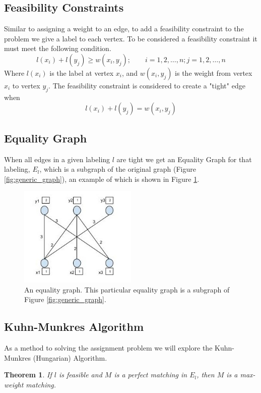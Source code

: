 \documentclass[twoside]{article}
\newcounter{lecnum}
\newtheorem{theorem}{Theorem}[lecnum]
\begin{document}
\subsection{Feasibility Constraints}
Similar to assigning a weight to an edge, to add a feasibility constraint to the problem we give a label to each vertex. To be considered a feasibility constraint it must meet the following condition.
\begin{equation} \label{eq1}
 l(x_{i}) + l(y_{j}) \geq w(x_{i},y_{j}); \qquad i=1,2,\ldots,n; j=1,2,\ldots,n
\end{equation}
Where $l(x_{i})$ is the label at vertex $x_{i}$, and $w(x_{i},y_{j})$ is the weight from vertex $x_{i}$ to vertex $y_{j}$. The feasibility constraint is considered to create a "tight" edge when 
\begin{equation} \label{eq2}
l(x_{i}) + l(y_{j}) = w(x_{i},y_{j})
\end{equation}

\subsection{Equality Graph}

When all edges in a given labeling $l$ are tight we get an Equality Graph for that labeling, $E_{l}$, which is a subgraph of the original graph (Figure \ref{fig:generic_graph}), an example of which is shown in Figure \ref{fig:equality_graph}.

\begin{figure}[h]
\begin{framed}
\centering
\includegraphics[width=0.5\textwidth]{figure2.jpg}
\end{framed}
\caption{\label{fig:equality_graph}An equality graph. This particular equality graph is a subgraph of Figure \ref{fig:generic_graph}.}
\end{figure}

\subsection{Kuhn-Munkres Algorithm}
As a method to solving the assignment problem we will explore the Kuhn-Munkres (Hungarian) Algorithm.
\begin{theorem} \label{theorem:Kuhn-Munkres}
If $l$ is feasible and $M$ is a perfect matching in $E_{l}$, then $M$ is a max-weight matching.
\end{theorem}
\end{document}
